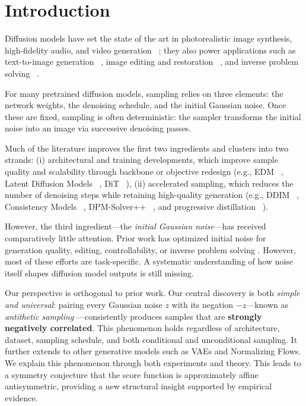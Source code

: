 \documentclass[12pt]{article}
\newcommand{\0}{\mathbf{0}}
\begin{document}
\section{Introduction}\label{sec:intro}

Diffusion models have set the state of the art in photorealistic image synthesis, high‑fidelity audio, and video generation ~\citep{sohl2015deep, ho2020denoising, song2021scorebased,kong2021diffwave}; they also power  applications such as text-to-image generation ~\citep{ldm2022high}, image editing and restoration ~\citep{meng2022sdedit}, and inverse problem solving ~\citep{song2022solving}. 

For many pretrained diffusion models, sampling relies on three elements: the  network weights, the denoising schedule, and the initial Gaussian noise. Once these are fixed, sampling is often deterministic: the sampler transforms the initial noise into an image via successive denoising passes.


Much of the literature improves the first two ingredients and clusters into two strands: (i)  architectural and training developments, which improve sample quality and scalability through backbone or objective redesign (e.g., EDM ~\citep{karras2022elucidating}, Latent Diffusion Models ~\citep{ldm2022high}, DiT ~\citep{peebles2023scalable}),  (ii) accelerated sampling, which reduces the number of denoising steps while retaining high-quality generation (e.g., DDIM ~\citep{songj2021denoising}, Consistency Models ~\citep{song2023consistency}, DPM‑Solver++ ~\citep{lu2023dpmsolver}, and progressive distillation ~\citep{salimans2022progressive}).


However, the third ingredient—the \emph{initial Gaussian noise}—has received comparatively little attention. Prior work has optimized initial noise for generation quality, editing,  controllability, or inverse problem solving \citep{guo2024initno,qi2024not,zhou2024golden,ban2025the,chen2024find,eyring2024reno,song2025ccs, wang2024dmplug, chihaoui2024blind}. However, most of these efforts are task-specific. A systematic understanding of how noise itself shapes diffusion model outputs is still missing.



Our perspective is orthogonal to prior work. Our central discovery is both  \emph{simple and universal}:  pairing every Gaussian noise \(z\) with its negation \(-z\)---known as \emph{antithetic sampling} \citep{mcbook}---consistently produces samples that are \textbf{strongly negatively correlated}. 
This phenomenon holds regardless of architecture, dataset,  sampling schedule, and both conditional and unconditional sampling. It further extends to other generative models such as VAEs and Normalizing Flows.
We explain this phenomenon through both experiments and theory. This leads to a symmetry conjecture that the score function is approximately affine antisymmetric, providing a new structural insight supported by empirical evidence.
\end{document}
